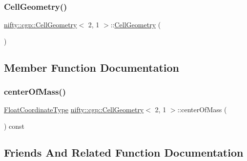 \subsubsection{\texorpdfstring{Cell\+Geometry()}{CellGeometry()}}
{\footnotesize\ttfamily \hyperlink{classnifty_1_1cgp_1_1CellGeometry}{nifty\+::cgp\+::\+Cell\+Geometry}$<$ 2, 1 $>$\+::\hyperlink{classnifty_1_1cgp_1_1CellGeometry}{Cell\+Geometry} (\begin{DoxyParamCaption}{ }\end{DoxyParamCaption})\hspace{0.3cm}{\ttfamily [inline]}}



\subsection{Member Function Documentation}
\mbox{\label{classnifty_1_1cgp_1_1CellGeometry_3_012_00_011_01_4_a45e1e4a17ac344f11cbe4f96796defe8}} 
\subsubsection{\texorpdfstring{center\+Of\+Mass()}{centerOfMass()}}
{\footnotesize\ttfamily \hyperlink{classnifty_1_1cgp_1_1CellGeometry_3_012_00_011_01_4_aa894ce050b43284dac01b3963e2e1e47}{Float\+Coordinate\+Type} \hyperlink{classnifty_1_1cgp_1_1CellGeometry}{nifty\+::cgp\+::\+Cell\+Geometry}$<$ 2, 1 $>$\+::center\+Of\+Mass (\begin{DoxyParamCaption}{ }\end{DoxyParamCaption}) const\hspace{0.3cm}{\ttfamily [inline]}}



\subsection{Friends And Related Function Documentation}
\mbox{\label{classnifty_1_1cgp_1_1CellGeometry_3_012_00_011_01_4_adfd68abfc6c19d6cc9ac2eb46fcfa819}} 
